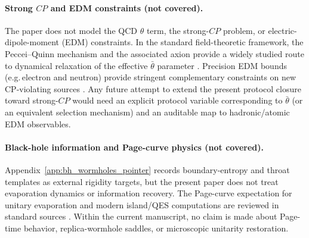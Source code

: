\paragraph{Strong $CP$ and EDM constraints (not covered).}
The paper does not model the QCD $\theta$ term, the strong-$CP$ problem, or electric-dipole-moment (EDM) constraints.
In the standard field-theoretic framework, the Peccei--Quinn mechanism and the associated axion provide a widely studied route to dynamical relaxation of the effective $\bar\theta$ parameter \cite{PecceiQuinn1977CPConservationPseudoparticles,PecceiQuinn1977ConstraintsCPConservation,Weinberg1978NewLightBoson,Wilczek1978StrongPTInstantons}.
Precision EDM bounds (e.g.\,electron and neutron) provide stringent complementary constraints on new CP-violating sources \cite{ACME2018ElectronEDM,AbelEtAl2020NeutronEDM,GranerChenLindahlHeckel2016HgEDM}.
Any future attempt to extend the present protocol closure toward strong-$CP$ would need an explicit protocol variable corresponding to $\bar\theta$ (or an equivalent selection mechanism) and an auditable map to hadronic/atomic EDM observables.

\paragraph{Black-hole information and Page-curve physics (not covered).}
Appendix~\ref{app:bh_wormholes_pointer} records boundary-entropy and throat templates as external rigidity targets, but the present paper does not treat evaporation dynamics or information recovery.
The Page-curve expectation for unitary evaporation and modern island/QES computations are reviewed in standard sources \cite{Page1993AverageEntropySubsystem,Page1993InformationInRadiation,AlmheiriHartmanMaldacenaShaghoulianTajdini2021EntropyHawkingRadiation,Penington2020EntanglementWedgeReconstruction,AlmheiriHartmanMaldacenaShaghoulianTajdini2020ReplicaWormholes}.
Within the current manuscript, no claim is made about Page-time behavior, replica-wormhole saddles, or microscopic unitarity restoration.


